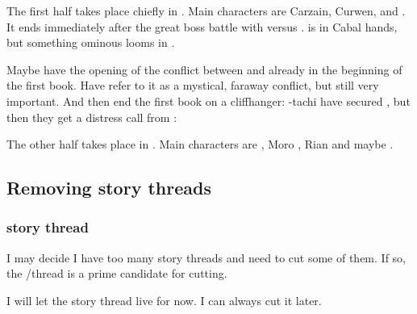 The first half takes place chiefly in \Forclin.
Main characters are Carzain, Curwen, \Achsah and \Takestsha.
It ends immediately after the great boss battle with \Achsah versus \Nzessuacrith.
\Forclin is in Cabal hands, but something ominous looms in \Malcur. 

Maybe have the opening of the conflict between \Teshrial and \Ishnaruchaefir already in the beginning of the first book.
Have \Achsah refer to it as a mystical, faraway conflict, but still very important. 
And then end the first book on a cliffhanger: 
\Achsah-tachi have secured \Forclin, but then they get a distress call from \Malcur:

The other half takes place in \Malcur. 
Main characters are \Teshrial, Moro \Cobrel, Rian and maybe \Tiroco. 










\subsection{Removing story threads}





\subsubsection{\Tiroco story thread}
I may decide I have too many story threads and need to cut some of them.
If so, the \Tiroco/\Icor thread is a prime candidate for cutting. 

I will let the story thread live for now. 
I can always cut it later.

